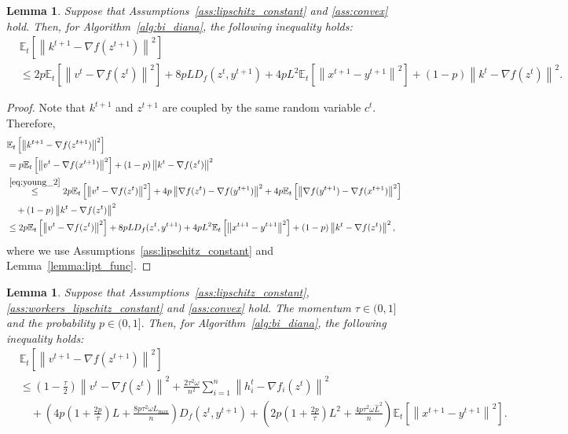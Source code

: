 \documentclass{article} %
\newcommand{\norm}[1]{\left\| #1 \right\|}
\newcommand{\ExpSub}[2]{{\mathbb{E}}_{#1}\left[#2\right]}
\theoremstyle{plain}
\newtheorem{lemma}[theorem]{Lemma}
\theoremstyle{definition}
\theoremstyle{remark}
\begin{document}
\begin{lemma}
  \label{lemma:bi_fast_diana_k}
  Suppose that Assumptions~\ref{ass:lipschitz_constant} and \ref{ass:convex} hold.
   Then, for Algorithm~\ref{alg:bi_diana}, the following inequality holds:
   \begin{equation}
   \begin{aligned}
    &\ExpSub{t}{\norm{k^{t+1} - \nabla f(z^{t+1})}^2} \\
    &\leq 2 p\ExpSub{t}{\norm{v^{t} - \nabla f(z^{t})}^2} + 8 p L D_f(z^{t}, y^{t+1}) + 4 p L^2 \ExpSub{t}{\norm{x^{t+1} - y^{t+1}}^2} + (1 - p)\norm{k^{t} - \nabla f(z^{t})}^2.
    \label{eq:bi_fast_diana_k}
  \end{aligned}
  \end{equation}
\end{lemma}
\begin{proof}
  Note that $k^{t+1}$ and $z^{t+1}$ are coupled by the same random variable $c^t.$ Therefore,
  \begin{align*}
    &\ExpSub{t}{\norm{k^{t+1} - \nabla f(z^{t+1})}^2} \\
    &=p\ExpSub{t}{\norm{v^{t} - \nabla f(x^{t+1})}^2} + (1 - p)\norm{k^{t} - \nabla f(z^{t})}^2 \\
    &\overset{\eqref{eq:young_2}}{\leq}2 p\ExpSub{t}{\norm{v^{t} - \nabla f(z^{t})}^2} + 4 p \norm{\nabla f(z^{t}) - \nabla f(y^{t+1})}^2 + 4 p\ExpSub{t}{\norm{\nabla f(y^{t+1}) - \nabla f(x^{t+1})}^2} \\
    &\quad + (1 - p)\norm{k^{t} - \nabla f(z^{t})}^2 \\
    &\leq 2 p\ExpSub{t}{\norm{v^{t} - \nabla f(z^{t})}^2} + 8 p L D_f(z^{t}, y^{t+1}) + 4 p L^2 \ExpSub{t}{\norm{x^{t+1} - y^{t+1}}^2} + (1 - p)\norm{k^{t} - \nabla f(z^{t})}^2,
  \end{align*}
  where we use Assumptions~\ref{ass:lipschitz_constant} and Lemma~\ref{lemma:lipt_func}.
\end{proof}

\begin{lemma}
  \label{lemma:bi_fast_diana_v}
  Suppose that Assumptions~\ref{ass:lipschitz_constant}, \ref{ass:workers_lipschitz_constant} and \ref{ass:convex} hold. The momentum $\tau \in (0, 1]$ and the probability $p \in (0, 1].$
   Then, for Algorithm~\ref{alg:bi_diana}, the following inequality holds:
   \begin{equation}
   \begin{aligned}
    \label{eq:bi_fast_diana_v}
    &\ExpSub{t}{\norm{v^{t+1} - \nabla f(z^{t+1})}^2} \\
    &\leq \left(1 - \frac{\tau}{2}\right) \norm{v^{t} - \nabla f(z^{t})}^2 + \frac{2 \tau^2 \omega}{n^2} \sum_{i=1}^n \norm{h^t_i - \nabla f_i(z^{t})}^2 \\
    &\quad + \left(4 p \left(1 + \frac{2 p}{\tau}\right) L + \frac{8 p \tau^2 \omega L_{\max}}{n}\right)D_f(z^t, y^{t+1}) + \left(2 p \left(1 + \frac{2 p}{\tau}\right) L^2 + \frac{4 p \tau^2 \omega \widehat{L}^2}{n}\right)\ExpSub{t}{\norm{x^{t+1} - y^{t+1}}^2}.
  \end{aligned}
  \end{equation}
\end{lemma}
\end{document}

